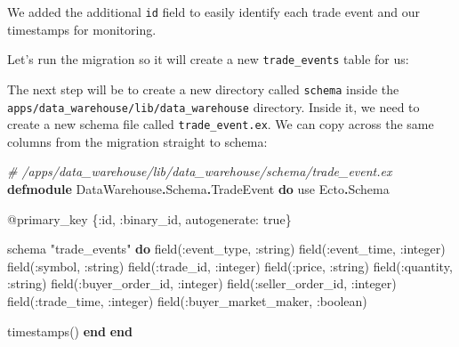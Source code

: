 \documentclass[
  oneside]{book}
\newenvironment{Shaded}{\begin{snugshade}}{\end{snugshade}}
\newcommand{\CommentTok}[1]{\textcolor[rgb]{0.56,0.35,0.01}{\textit{#1}}}
\newcommand{\ConstantTok}[1]{\textcolor[rgb]{0.00,0.00,0.00}{#1}}
\newcommand{\ImportTok}[1]{#1}
\newcommand{\KeywordTok}[1]{\textcolor[rgb]{0.13,0.29,0.53}{\textbf{#1}}}
\newcommand{\NormalTok}[1]{#1}
\newcommand{\OperatorTok}[1]{\textcolor[rgb]{0.81,0.36,0.00}{\textbf{#1}}}
\newcommand{\OtherTok}[1]{\textcolor[rgb]{0.56,0.35,0.01}{#1}}
\newcommand{\StringTok}[1]{\textcolor[rgb]{0.31,0.60,0.02}{#1}}
\newcommand{\VariableTok}[1]{\textcolor[rgb]{0.00,0.00,0.00}{#1}}
\begin{document}
We added the additional \texttt{id} field to easily identify each trade event and our timestamps for monitoring.

Let's run the migration so it will create a new \texttt{trade\_events} table for us:

\begin{Shaded}
\end{Shaded}

The next step will be to create a new directory called \texttt{schema} inside the \texttt{apps/data\_warehouse/lib/data\_warehouse} directory. Inside it, we need to create a new schema file called \texttt{trade\_event.ex}. We can copy across the same columns from the migration straight to schema:

\begin{Shaded}
\begin{Highlighting}[]
\CommentTok{\# /apps/data\_warehouse/lib/data\_warehouse/schema/trade\_event.ex}
\KeywordTok{defmodule} \ConstantTok{DataWarehouse}\OperatorTok{.}\ConstantTok{Schema}\OperatorTok{.}\ConstantTok{TradeEvent} \KeywordTok{do}
  \ImportTok{use} \ConstantTok{Ecto}\OperatorTok{.}\ConstantTok{Schema}

  \OtherTok{@primary\_key}\NormalTok{ \{}\VariableTok{:id}\NormalTok{, }\VariableTok{:binary\_id}\NormalTok{, }\VariableTok{autogenerate:} \ConstantTok{true}\NormalTok{\}}

\NormalTok{  schema }\StringTok{"trade\_events"} \KeywordTok{do}
\NormalTok{    field(}\VariableTok{:event\_type}\NormalTok{, }\VariableTok{:string}\NormalTok{)}
\NormalTok{    field(}\VariableTok{:event\_time}\NormalTok{, }\VariableTok{:integer}\NormalTok{)}
\NormalTok{    field(}\VariableTok{:symbol}\NormalTok{, }\VariableTok{:string}\NormalTok{)}
\NormalTok{    field(}\VariableTok{:trade\_id}\NormalTok{, }\VariableTok{:integer}\NormalTok{)}
\NormalTok{    field(}\VariableTok{:price}\NormalTok{, }\VariableTok{:string}\NormalTok{)}
\NormalTok{    field(}\VariableTok{:quantity}\NormalTok{, }\VariableTok{:string}\NormalTok{)}
\NormalTok{    field(}\VariableTok{:buyer\_order\_id}\NormalTok{, }\VariableTok{:integer}\NormalTok{)}
\NormalTok{    field(}\VariableTok{:seller\_order\_id}\NormalTok{, }\VariableTok{:integer}\NormalTok{)}
\NormalTok{    field(}\VariableTok{:trade\_time}\NormalTok{, }\VariableTok{:integer}\NormalTok{)}
\NormalTok{    field(}\VariableTok{:buyer\_market\_maker}\NormalTok{, }\VariableTok{:boolean}\NormalTok{)}

\NormalTok{    timestamps()}
  \KeywordTok{end}
\KeywordTok{end}
\end{Highlighting}
\end{Shaded}
\end{document}
